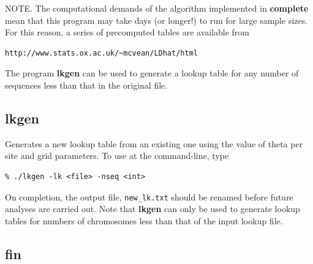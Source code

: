 \documentclass[a4paper,10pt,fullpage]{article}
\begin{document}
\noindent NOTE.  The computational demands of the algorithm
implemented in {\bf complete} mean that this program may take days
(or longer!) to run for large sample sizes.  For this reason, a
series of precomputed tables are available from
\begin{verbatim}
http://www.stats.ox.ac.uk/~mcvean/LDhat/html
\end{verbatim}

\noindent The
program {\bf lkgen} can be used to generate a lookup table for any
number of sequences less than that in the original file.

\subsection{lkgen}

Generates a new lookup table from an existing one using the value
of theta per site and grid parameters.  To use at the
command-line, type\\
\begin{verbatim}
% ./lkgen -lk <file> -nseq <int>
\end{verbatim}

\noindent On completion, the output file, {\verb+new_lk.txt+} should be
renamed before future analyses are carried out.  Note that {\bf lkgen} can only be used to generate lookup tables for numbers of chromosomes less than that of the input lookup file.


\subsection{fin}
\end{document}
